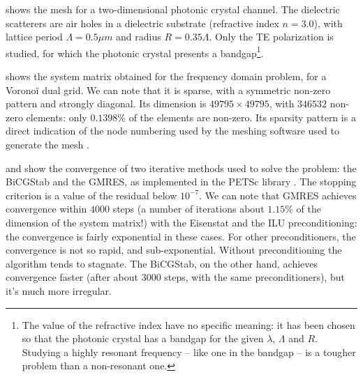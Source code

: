  shows the mesh for a two-dimensional photonic crystal
channel. The dielectric scatterers are air holes in a dielectric
substrate (refractive index $n = 3.0$), with lattice period $\Lambda =
0.5 \mu m$ and radius $R = 0.35 \Lambda$. Only the TE polarization is
studied, for which the photonic crystal presents a
bandgap\footnote{The value of the refractive index have no specific
  meaning: it has been chosen so that the photonic crystal has a
  bandgap for the given $\lambda$, $\Lambda$ and $R$. Studying a
  highly resonant frequency -- like one in the bandgap -- is a tougher
  problem than a non-resonant one.}.

 shows the system matrix obtained for
the frequency domain problem, for a Vorono\"i dual grid. We can note
that it is sparse, with a symmetric non-zero pattern and strongly
diagonal. Its dimension is $49795 \times 49795$, with $346532$
non-zero elements: only $0.1398\%$ of the elements are non-zero. Its
sparsity pattern is a direct indication of the node numbering used by
the meshing software used to generate the mesh \cite{triangle}.

 and  show
the convergence of two iterative methods used to solve the problem:
the BiCGStab and the GMRES, as implemented in the PETSc library
\cite{petsc}. The stopping criterion is a value of the residual below
$10^{-7}$. We can note that GMRES achieves convergence within $4000$
steps (a number of iterations about $1.15\%$ of the dimension of the
system matrix!) with the Eisenstat \cite{petsc} and the ILU
preconditioning: the convergence is fairly exponential in these
cases. For other preconditioners, the convergence is not so rapid, and
sub-exponential. Without preconditioning the algorithm tends to
stagnate. The BiCGStab, on the other hand, achieves convergence faster
(after about $3000$ steps, with the same preconditioners), but it's
much more irregular.

